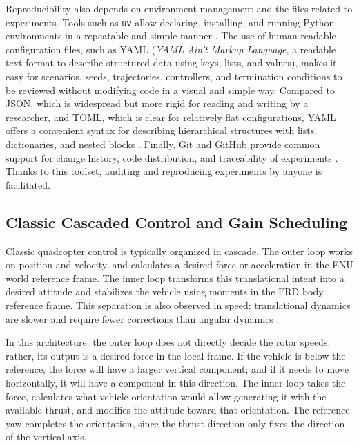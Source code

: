 Reproducibility also depends on environment management and the files related to experiments. Tools such as \texttt{uv} allow declaring, installing, and running Python environments in a repeatable and simple manner \cite{uvDocs}. The use of human-readable configuration files, such as YAML (\textit{YAML Ain't Markup Language}, a readable text format to describe structured data using keys, lists, and values), makes it easy for scenarios, seeds, trajectories, controllers, and termination conditions to be reviewed without modifying code in a visual and simple way. Compared to JSON, which is widespread but more rigid for reading and writing by a researcher, and TOML, which is clear for relatively flat configurations, YAML offers a convenient syntax for describing hierarchical structures with lists, dictionaries, and nested blocks \cite{yamlSpec,jsonRFC,tomlSpec}. Finally, Git and GitHub provide common support for change history, code distribution, and traceability of experiments \cite{githubDocs}. Thanks to this toolset, auditing and reproducing experiments by anyone is facilitated.

\subsection{Classic Cascaded Control and Gain Scheduling}

Classic quadcopter control is typically organized in cascade. The outer loop works on position and velocity, and calculates a desired force or acceleration in the ENU world reference frame. The inner loop transforms this translational intent into a desired attitude and stabilizes the vehicle using moments in the FRD body reference frame. This separation is also observed in speed: translational dynamics are slower and require fewer corrections than angular dynamics \cite{beard2012small,mellinger2011minimum,lee2010geometric}.

In this architecture, the outer loop does not directly decide the rotor speeds; rather, its output is a desired force in the local frame. If the vehicle is below the reference, the force will have a larger vertical component; and if it needs to move horizontally, it will have a component in this direction. The inner loop takes the force, calculates what vehicle orientation would allow generating it with the available thrust, and modifies the attitude toward that orientation. The reference yaw completes the orientation, since the thrust direction only fixes the direction of the vertical axis.

